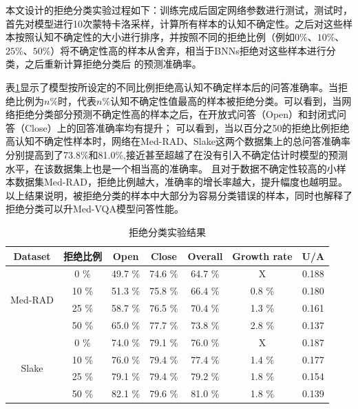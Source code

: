 本文设计的拒绝分类实验过程如下：训练完成后固定网络参数进行测试，测试时，首先对模型进行10次蒙特卡洛采样，计算所有样本的认知不确定性。之后对这些样本按照认知不确定性的大小进行排序，并按照不同的拒绝比例（例如$0\%$、$10\%$、$25\%$、$50\%$）将不确定性高的样本从舍弃，相当于BNNs拒绝对这些样本进行分类，之后重新计算拒绝分类后
的预测准确率。

表\ref{reject_exm}显示了模型按所设定的不同比例拒绝高认知不确定样本后的问答准确率。当拒绝比例为$n \%$时，代表$n \%$认知不确定性值最高的样本被拒绝分类。可以看到，当网络拒绝分类部分预测不确定性高的样本之后，在开放式问答（Open）和封闭式问答（Close）上的回答准确率均有提升；
可以看到，当以百分之50的拒绝比例拒绝高认知不确定性样本时，网络在Med-RAD、Slake这两个数据集上的总问答准确率分别提高到了73.8\%和81.0\%,接近甚至超越了在没有引入不确定估计时模型的预测水平，在该数据集上也是一个相当高的准确率。
且对于数据不确定性较高的小样本数据集Med-RAD，拒绝比例越大，准确率的增长率越大，提升幅度也越明显。以上结果说明，被拒绝分类的样本中大部分为容易分类错误的样本，同时也解释了拒绝分类可以升Med-VQA模型问答性能。
\begin{table}
	\caption{\label{reject_exm}拒绝分类实验结果}
	\centering
	\small %
	\begin{tabular}{c|c|ccccc}
		\hline Dataset & 拒绝比例 & Open & Close & Overall & Growth rate & U/A \\
		\hline \multirow{4}{*}{Med-RAD} & 0 \%& 49.7 \%& 74.6 \%& 64.7 \%& X& 0.188 \\
		& 10 \%& 51.3 \%& 75.8 \%& 66.4 \%& 0.8 \% & 0.180 \\
		& 25 \%& 58.7 \%& 76.5 \%& 70.4 \%& 1.3 \% & 0.161 \\
		& 50 \%& 65.0 \%& 77.7 \%& 73.8 \%& 2.8 \% & 0.137 \\
		\hline \multirow{4}{*}{Slake} & 0 \%& 74.0 \%& 79.1 \%& 76.0 \%& X& 0.187 \\
		& 10 \%& 76.0 \%& 79.4 \%& 77.4 \%& 1.4 \% & 0.177 \\
		& 25 \%& 79.1 \%& 79.4 \%& 79.2 \%& 1.8 \% & 0.154 \\
		& 50 \%& 82.1 \%& 79.6 \%& 81.0 \%& 1.8 \% & 0.139 \\
		\hline
	\end{tabular}
\end{table}

